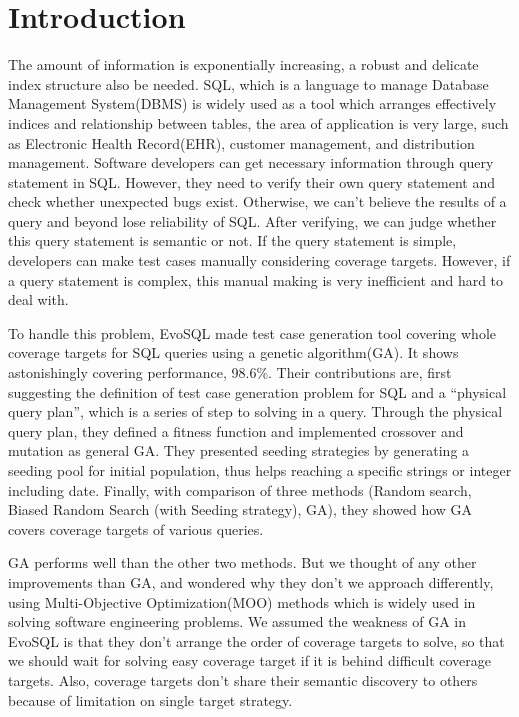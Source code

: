 \chapter{Introduction}

The amount of information is exponentially increasing, a robust and delicate index structure also be needed. SQL, which is a language to manage Database Management System(DBMS) is widely used as a tool which arranges effectively indices and relationship between tables, the area of application is very large, such as Electronic Health Record(EHR), customer management, and distribution management. Software developers can get necessary information through query statement in SQL. However, they need to verify their own query statement and check whether unexpected bugs exist. Otherwise, we can't believe the results of a query and beyond lose reliability of SQL. After verifying, we can judge whether this query statement is semantic or not. If the query statement is simple, developers can make test cases manually considering coverage targets. However, if a query statement is complex, this manual making is very inefficient and hard to deal with.

To handle this problem, EvoSQL\cite{castelein2018search} made test case generation tool covering whole coverage targets for SQL queries using a genetic algorithm(GA). It shows astonishingly covering performance, 98.6\%. Their contributions are, first suggesting the definition of test case generation problem for SQL and a ``physical query plan'', which is a series of step to solving in a query. Through the physical query plan, they defined a fitness function and implemented crossover and mutation as general GA. They presented seeding strategies by generating a seeding pool for initial population, thus helps reaching a specific strings or integer including date. Finally,  with comparison of three methods (Random search, Biased Random Search (with Seeding strategy), GA), they showed how GA covers coverage targets of various queries.
 

GA performs well than the other two methods. But we thought of any other improvements than GA, and wondered why they don't we approach differently, using Multi-Objective Optimization(MOO) methods which is widely used in solving software engineering problems. We assumed the weakness of GA in EvoSQL is that they don't arrange the order of coverage targets to solve, so that we should wait for solving easy coverage target if it is behind difficult coverage targets. Also, coverage targets don't share their semantic discovery to others because of limitation on single target strategy.
 

